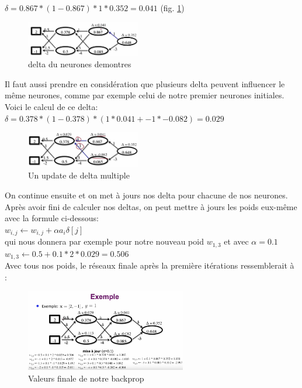 \documentclass[oneside]{book}
\begin{document}
$\delta = 0.867 * (1- 0.867) * 1 * 0.352 = 0.041$ (fig. \ref{fig:backprop3})\\

\begin{figure}[!ht]
\centering
\includegraphics[width = 5cm]{exemple_backprop3.png}
\caption{delta du neurones demontres}
\label{fig:backprop3}
\end{figure}

Il faut aussi prendre en considération que plusieurs delta peuvent influencer le même neurones, comme par exemple celui de notre premier neurones initiales. Voici le calcul de ce delta:\\

\centering
$\delta = 0.378 * (1-0.378) * (1*0.041 + -1*-0.082) = 0.029$\\

\begin{figure}[!ht]
\centering
\includegraphics[width = 5cm]{exemple_backprop4.png}
\caption{Un update de delta multiple}
\label{fig:backprop4}
\end{figure}

On continue ensuite et on met à jours nos delta pour chacune de nos neurones. Après avoir fini de calculer nos deltas, on peut mettre à jours les poids eux-même avec la formule ci-dessous: \\

\centering
$w_{i,j} \leftarrow w_{i,j} + \alpha a_i \delta [j]$\\

qui nous donnera par exemple pour notre nouveau poid $w_{1,3}$ et avec $\alpha = 0.1$\\

$w_{1,3} \leftarrow 0.5 + 0.1 * 2 * 0.029 = 0.506$\\

Avec tous nos poids, le réseaux finale après la première itérations ressemblerait à :\\

\begin{figure}[!ht]
\centering
\includegraphics[width = 7cm]{exemple_backprop5.png}
\caption{Valeurs finale de notre backprop}
\label{fig:backprop5}

\end{figure}
\justify
\end{document}
